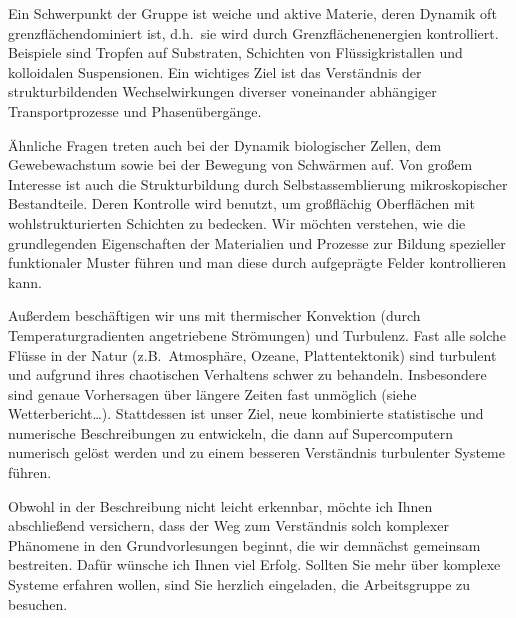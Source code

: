 \begin{multicols}{2}
Ein Schwerpunkt der Gruppe ist weiche und aktive Materie, deren Dynamik oft grenzflächendominiert ist, d.h.\ sie wird durch Grenzflächenenergien kontrolliert. Beispiele sind Tropfen auf Substraten, Schichten von Flüssigkristallen und kolloidalen Suspensionen. Ein wichtiges Ziel ist das Verständnis der strukturbildenden Wechselwirkungen diverser voneinander abhängiger Transportprozesse und Phasenübergänge.

Ähnliche Fragen treten auch bei der Dynamik biologischer Zellen, dem Gewebewachstum sowie bei der Bewegung von Schwärmen auf. Von großem Interesse ist auch die Strukturbildung durch Selbstassemblierung mikroskopischer Bestandteile. Deren Kontrolle wird benutzt, um großflächig Oberflächen mit wohlstrukturierten Schichten zu bedecken. Wir möchten verstehen, wie die grundlegenden Eigenschaften der Materialien und Prozesse zur Bildung spezieller funktionaler Muster führen und man diese durch aufgeprägte Felder kontrollieren kann.

Außerdem beschäftigen wir uns mit thermischer Konvektion (durch Temperaturgradienten angetriebene Strömungen) und Turbulenz. Fast alle solche Flüsse in der Natur (z.B.\ Atmosphäre, Ozeane, Plattentektonik) sind turbulent und aufgrund ihres chaotischen Verhaltens schwer zu behandeln. Insbesondere sind genaue Vorhersagen über längere Zeiten fast unmöglich (siehe Wetterbericht\dots). Stattdessen ist unser Ziel, neue kombinierte statistische und numerische Beschreibungen zu entwickeln, die dann auf Supercomputern numerisch gelöst werden und zu einem besseren Verständnis turbulenter Systeme führen.

Obwohl in der Beschreibung nicht leicht erkennbar, möchte ich Ihnen abschließend versichern, dass der Weg zum Verständnis solch komplexer Phänomene in den Grundvorlesungen beginnt, die wir demnächst gemeinsam bestreiten. Dafür wünsche ich Ihnen viel Erfolg. Sollten Sie mehr über komplexe Systeme erfahren wollen, sind Sie herzlich eingeladen, die Arbeitsgruppe zu besuchen.
\end{multicols}

\newpage

